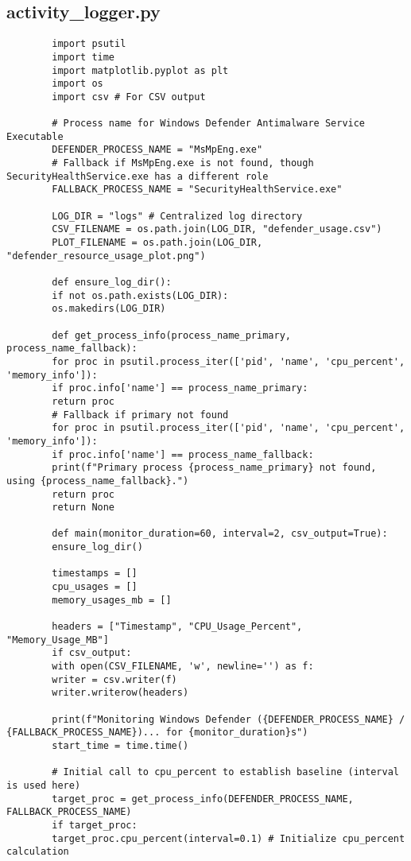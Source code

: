 \documentclass[11pt]{article}
\begin{document}
	\subsection{activity\_logger.py}
	\begin{verbatim}
		import psutil
		import time
		import matplotlib.pyplot as plt
		import os
		import csv # For CSV output
		
		# Process name for Windows Defender Antimalware Service Executable
		DEFENDER_PROCESS_NAME = "MsMpEng.exe" 
		# Fallback if MsMpEng.exe is not found, though SecurityHealthService.exe has a different role
		FALLBACK_PROCESS_NAME = "SecurityHealthService.exe" 
		
		LOG_DIR = "logs" # Centralized log directory
		CSV_FILENAME = os.path.join(LOG_DIR, "defender_usage.csv")
		PLOT_FILENAME = os.path.join(LOG_DIR, "defender_resource_usage_plot.png")
		
		def ensure_log_dir():
		if not os.path.exists(LOG_DIR):
		os.makedirs(LOG_DIR)
		
		def get_process_info(process_name_primary, process_name_fallback):
		for proc in psutil.process_iter(['pid', 'name', 'cpu_percent', 'memory_info']):
		if proc.info['name'] == process_name_primary:
		return proc
		# Fallback if primary not found
		for proc in psutil.process_iter(['pid', 'name', 'cpu_percent', 'memory_info']):
		if proc.info['name'] == process_name_fallback:
		print(f"Primary process {process_name_primary} not found, using {process_name_fallback}.")
		return proc
		return None
		
		def main(monitor_duration=60, interval=2, csv_output=True):
		ensure_log_dir()
		
		timestamps = []
		cpu_usages = []
		memory_usages_mb = []
		
		headers = ["Timestamp", "CPU_Usage_Percent", "Memory_Usage_MB"]
		if csv_output:
		with open(CSV_FILENAME, 'w', newline='') as f:
		writer = csv.writer(f)
		writer.writerow(headers)
		
		print(f"Monitoring Windows Defender ({DEFENDER_PROCESS_NAME} / {FALLBACK_PROCESS_NAME})... for {monitor_duration}s")
		start_time = time.time()
		
		# Initial call to cpu_percent to establish baseline (interval is used here)
		target_proc = get_process_info(DEFENDER_PROCESS_NAME, FALLBACK_PROCESS_NAME)
		if target_proc:
		target_proc.cpu_percent(interval=0.1) # Initialize cpu_percent calculation
		

\end{verbatim}
\end{document}
